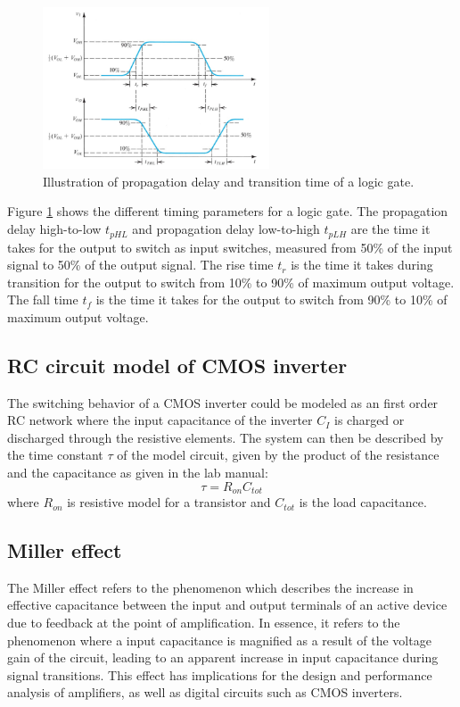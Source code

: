 \documentclass[onecolumn]{article}
\begin{document}
\begin{figure}[h!]
    \centering
    \includegraphics[width=0.6\textwidth]{tphl.png}
    \caption{Illustration of propagation delay and transition time of a logic gate. \cite{Sedra/Smith}}
    \label{fig:tphl}
\end{figure}

Figure \ref{fig:tphl} shows the different timing parameters for a logic gate. The propagation delay high-to-low $t_{pHL}$ and propagation delay low-to-high $t_{pLH}$ are the time it takes for the output to switch as input switches, measured from 50\% of the input signal to 50\% of the output signal. The rise time $t_{r}$ is the time it takes during transition for the output to switch from 10\% to 90\% of maximum output voltage. The fall time $t_{f}$ is the time it takes for the output to switch from 90\% to 10\% of maximum output voltage.

\subsection{RC circuit model of CMOS inverter}
The switching behavior of a CMOS inverter could be modeled as an first order RC network where the input capacitance of the inverter $C_I$ is charged or discharged through the resistive elements. The system can then be described by the time constant $\tau$ of the model circuit, given by the product of the resistance and the capacitance as given in the lab manual:
\begin{equation}\label{eq:tau} \tau = R_{on}C_{tot}\end{equation}
 where $R_{on}$ is resistive model for a transistor and $C_{tot}$ is the load capacitance.

\subsection{Miller effect}
The Miller effect refers to the phenomenon which describes the increase in effective capacitance between the input and output terminals of an active device due to feedback at the point of amplification. In essence, it refers to the phenomenon where a input capacitance is magnified as a result of the voltage gain of the circuit, leading to an apparent increase in input capacitance during signal transitions. This effect has implications for the design and performance analysis of amplifiers, as well as digital circuits such as CMOS inverters.
\end{document}
